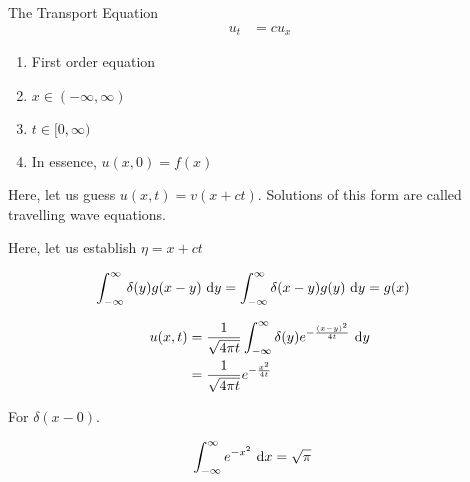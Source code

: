 The Transport Equation
%
\begin{align}
  u_t & = cu_x
\end{align}
\begin{enumerate}
  \item First order equation
  \item $x \in (-\infty, \infty)$
  \item $t \in [0, \infty)$
  \item In essence, $u(x, 0) = f(x)$
\end{enumerate}

Here, let us guess $u(x, t) = v(x + ct)$. Solutions of this form are called travelling wave equations.

Here, let us establish $\eta = x + ct$

%
\begin{align}
  \int^\infty_{-\infty} \delta(y) g(x - y)\ \text dy & = \int^\infty_{-\infty} \delta(x - y) g(y)\ \text dy = g(x)
\end{align}

%
\begin{align}
  u(x, t) & = \frac{1}{\sqrt{4 \pi t}} \int^\infty_{-\infty} \delta(y) e^{- \frac{(x - y)^2}{4t}}\ \text dy\\
  & = \frac{1}{\sqrt{4 \pi t}} e^{-\frac{x^2}{4t}}
\end{align}

For $\delta(x - 0)$.

%
\begin{align}
  \int^\infty_{-\infty} e^{-x^2}\ \text dx & = \sqrt \pi
\end{align}
